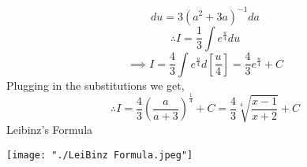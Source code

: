 \documentclass[14pt]{article}
\begin{document}
	\begin{equation*}
		du = 3(a^2+3a)^{-1}da
	\end{equation*}
	\begin{equation*}
		\therefore I = \frac{1}{3}\int e^{\frac{u}{4}} du
	\end{equation*}
	\begin{equation*}
		\implies I = \frac{4}{3} \int e^{\frac{u}{4}} d[\frac{u}{4}] = \frac{4}{3} e^{\frac{u}{4}} + C
	\end{equation*}
	Plugging in the substitutions we get,
	\begin{equation*}
		\therefore I = \frac{4}{3} (\frac{a}{a+3})^{\frac{1}{4}} +C=\boxed{\frac{4}{3} \sqrt[4]{\frac{x-1}{x+2}} +C}
	\end{equation*}
	Leibinz's Formula
	\begin{center}		%
		\texttt{[image: "./LeiBinz Formula.jpeg"]} %
	\end{center}
\end{document}
